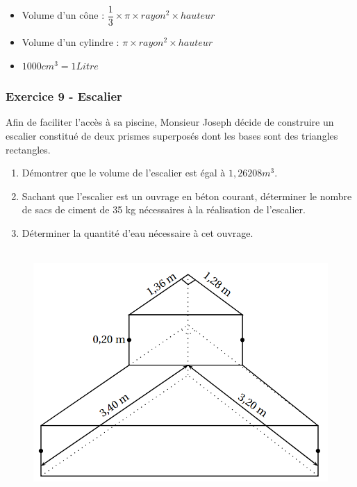 \documentclass[11pt]{article}
\begin{document}
\begin{multicols}{2}
  \begin{itemize}
  \item Volume d’un cône : $\dfrac{1}{3} \times \pi \times rayon^2 \times hauteur$
  \item Volume d’un cylindre : $\pi \times rayon^2 \times hauteur$
  \item $1000 cm^3 = 1 Litre$
  \end{itemize}

\end{multicols}

\newpage

\subsubsection*{Exercice 9 - Escalier}

\begin{multicols}{2}

  Afin de faciliter l'accès à sa piscine, Monsieur Joseph décide de construire un escalier constitué de deux prismes superposés dont les bases sont des triangles rectangles.

  \begin{enumerate}
  \item Démontrer que le volume de l'escalier est égal à $1,26208 m^3$.
  \item Sachant que l'escalier est un ouvrage en béton courant, déterminer le nombre de sacs de ciment de 35 kg nécessaires à la réalisation de l'escalier.
  \item Déterminer la quantité d'eau nécessaire à cet ouvrage.
  \end{enumerate}

  \begin{figure}[H]
        \centering
        \includegraphics[width=\linewidth]{3x3-volumes-1/sources/escalier.png}
  \end{figure}


\end{multicols}
\end{document}
